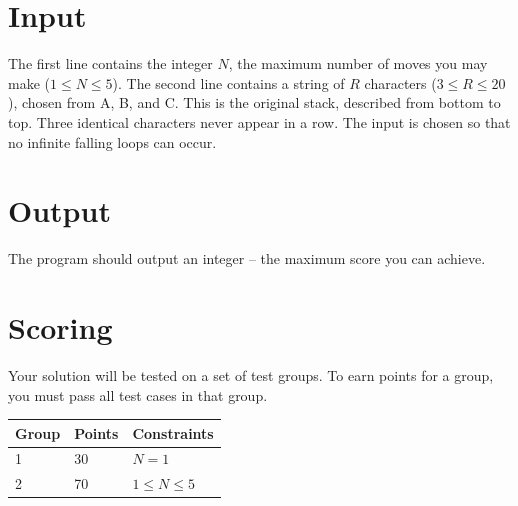 \section*{Input}
The first line contains the integer $N$, the maximum number of moves you may make ($1 \le N \le 5$). The second line contains a string of $R$ characters ($3 \le R \le 20$), chosen from A, B, and C. This is the original stack, described from bottom to top. Three identical characters never appear in a row. The input is chosen so that no infinite falling loops can occur.

\section*{Output}
The program should output an integer -- the maximum score you can achieve.


\section*{Scoring}
Your solution will be tested on a set of test groups. To earn points for a group,
you must pass all test cases in that group.

\begin{tabular}{| l | l | l |}
\hline
Group & Points & Constraints \\ \hline
1     & 30         & $N=1$ \\ 
2     & 70         & $1 \le N \le 5$ \\ \hline
\end{tabular}
